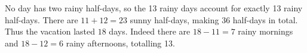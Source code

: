 No day has two rainy half-days, so the 13 rainy days account for exactly 13 rainy half-days. There are $ 11+12=23 $ sunny half-days, making 36 half-days in total. Thus the vacation lasted $\boxed{18}$ days. Indeed there are $ 18-11=7 $ rainy mornings and $ 18-12=6 $ rainy afternoons, totalling 13.
